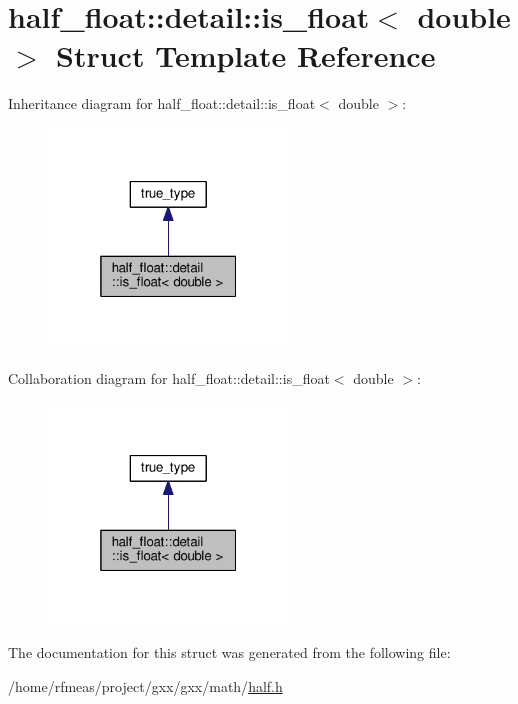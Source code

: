 \hypertarget{structhalf__float_1_1detail_1_1is__float_3_01double_01_4}{}\section{half\+\_\+float\+:\+:detail\+:\+:is\+\_\+float$<$ double $>$ Struct Template Reference}
\label{structhalf__float_1_1detail_1_1is__float_3_01double_01_4}


Inheritance diagram for half\+\_\+float\+:\+:detail\+:\+:is\+\_\+float$<$ double $>$\+:
\nopagebreak
\begin{figure}[H]
\begin{center}
\leavevmode
\includegraphics[width=181pt]{structhalf__float_1_1detail_1_1is__float_3_01double_01_4__inherit__graph}
\end{center}
\end{figure}


Collaboration diagram for half\+\_\+float\+:\+:detail\+:\+:is\+\_\+float$<$ double $>$\+:
\nopagebreak
\begin{figure}[H]
\begin{center}
\leavevmode
\includegraphics[width=181pt]{structhalf__float_1_1detail_1_1is__float_3_01double_01_4__coll__graph}
\end{center}
\end{figure}


The documentation for this struct was generated from the following file\+:\begin{DoxyCompactItemize}
\item 
/home/rfmeas/project/gxx/gxx/math/\hyperlink{half_8h}{half.\+h}\end{DoxyCompactItemize}
